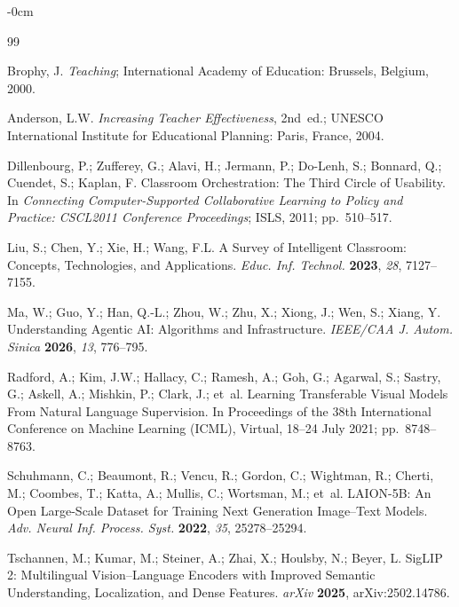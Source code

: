 \documentclass[symmetry,article,submit,pdftex,moreauthors]{Definitions/mdpi}
\begin{document}
\begin{adjustwidth}{-\extralength}{0cm}


\begin{thebibliography}{99}

Brophy, J.
\textit{Teaching}; International Academy of Education: Brussels, Belgium, 2000.

Anderson, L.W.
\textit{Increasing Teacher Effectiveness}, 2nd~ed.; UNESCO International Institute for Educational Planning: Paris, France, 2004.

Dillenbourg, P.; Zufferey, G.; Alavi, H.; Jermann, P.; Do-Lenh, S.; Bonnard, Q.; Cuendet, S.; Kaplan, F.
Classroom Orchestration: The Third Circle of Usability.
In \textit{Connecting Computer-Supported Collaborative Learning to Policy and Practice: CSCL2011 Conference Proceedings}; ISLS, 2011; pp.~510--517.

Liu, S.; Chen, Y.; Xie, H.; Wang, F.L.
A Survey of Intelligent Classroom: Concepts, Technologies, and Applications.
\textit{Educ. Inf. Technol.} \textbf{2023}, \textit{28}, 7127--7155.

Ma, W.; Guo, Y.; Han, Q.-L.; Zhou, W.; Zhu, X.; Xiong, J.; Wen, S.; Xiang, Y.
Understanding Agentic AI: Algorithms and Infrastructure.
\textit{IEEE/CAA J. Autom. Sinica} \textbf{2026}, \textit{13}, 776--795.

Radford, A.; Kim, J.W.; Hallacy, C.; Ramesh, A.; Goh, G.; Agarwal, S.; Sastry, G.; Askell, A.; Mishkin, P.; Clark, J.; et~al.
Learning Transferable Visual Models From Natural Language Supervision.
In Proceedings of the 38th International Conference on Machine Learning (ICML), Virtual, 18--24 July 2021; pp.~8748--8763.

Schuhmann, C.; Beaumont, R.; Vencu, R.; Gordon, C.; Wightman, R.; Cherti, M.; Coombes, T.; Katta, A.; Mullis, C.; Wortsman, M.; et~al.
LAION-5B: An Open Large-Scale Dataset for Training Next Generation Image--Text Models.
\textit{Adv. Neural Inf. Process. Syst.} \textbf{2022}, \textit{35}, 25278--25294.

Tschannen, M.; Kumar, M.; Steiner, A.; Zhai, X.; Houlsby, N.; Beyer, L.
SigLIP 2: Multilingual Vision--Language Encoders with Improved Semantic Understanding, Localization, and Dense Features.
\textit{arXiv} \textbf{2025}, arXiv:2502.14786.


\end{thebibliography}
\end{adjustwidth}
\end{document}
